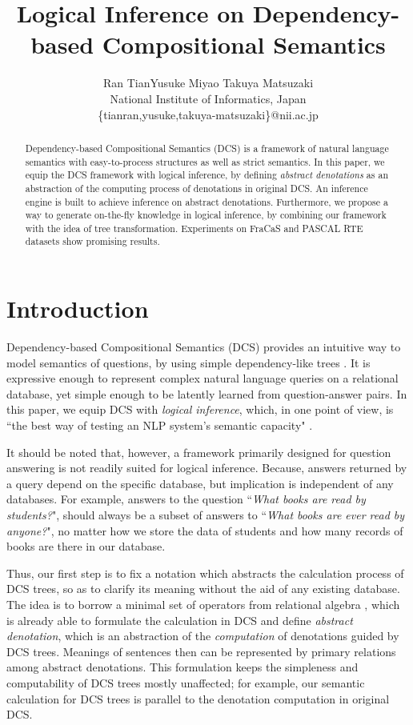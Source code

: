 \documentclass[11pt]{article}
\title{Logical Inference on Dependency-based Compositional Semantics}
\author{Ran Tian\quad\quad Yusuke Miyao \quad\quad Takuya Matsuzaki\\
  National Institute of Informatics, Japan \\
  {\{tianran,yusuke,takuya-matsuzaki\}@nii.ac.jp} \\
}
\date{}
\begin{document}
\maketitle
\begin{abstract}

Dependency-based Compositional Semantics (DCS) is a framework of
natural language semantics with easy-to-process structures as well as
strict semantics.
In this paper, we equip the DCS framework with logical inference, by defining \textit{abstract 
denotations} as an abstraction of the computing process of denotations in original DCS. An inference 
engine is built to achieve inference on abstract denotations. Furthermore, we propose a way to 
generate on-the-fly knowledge in logical inference, by combining our framework with the 
idea of tree transformation. Experiments on FraCaS and PASCAL RTE datasets show 
promising results.
\end{abstract}

\section{Introduction}
\label{sec:introduction}

Dependency-based Compositional Semantics (DCS) provides an intuitive way to model semantics of 
questions, by using simple dependency-like trees \cite{liang11}. 
It is expressive enough to represent complex natural language queries on a relational 
database, yet 
simple enough to be latently learned from question-answer pairs. In this paper, we equip DCS with 
\emph{logical inference}, 
which, in one point of view, is ``the best way of testing an NLP system's semantic capacity" \cite{fracas}. 

It should be noted that, however, a framework primarily designed for question answering 
is not readily suited for logical inference. Because, answers returned by a query 
depend on the specific database, but implication is independent of any databases. 
For example, answers to the question ``\textit{What books are read by students?}", should always 
be a subset of answers to ``\textit{What books are ever read by anyone?}", no matter how we store 
the data of students and how many records of books are there in our database. 

Thus, our first step is to fix a notation which abstracts the calculation process of DCS trees, 
so as to clarify its meaning without the aid of any existing database. The idea is to 
borrow a minimal set of operators from relational algebra \cite{Codd70}, which is already able 
to formulate 
the calculation in DCS and define \textit{abstract denotation}, which is an abstraction of 
the \emph{computation} of denotations guided by DCS trees. Meanings of sentences then can be represented 
by primary relations among abstract denotations. This formulation keeps 
the simpleness and computability of DCS trees mostly unaffected; for example, our semantic calculation 
for DCS trees is parallel to the denotation computation in original DCS. 
\end{document}
